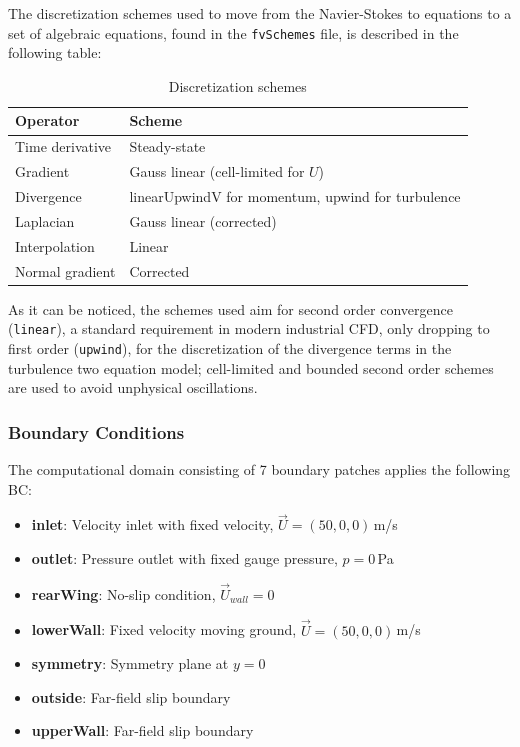 \documentclass[12pt,a4paper]{article}
\begin{document}
The discretization schemes used to move from the Navier-Stokes to equations to a set of algebraic equations, found in the \texttt{fvSchemes} file, is described in the following table:

\begin{table}[H]
\centering
\label{tab:schemes}
\begin{tabular}{@{}ll@{}}
\toprule
\textbf{Operator} & \textbf{Scheme} \\
\midrule
Time derivative & Steady-state \\
Gradient & Gauss linear (cell-limited for $U$) \\
Divergence & linearUpwindV for momentum, upwind for turbulence \\
Laplacian & Gauss linear (corrected) \\
Interpolation & Linear \\
Normal gradient & Corrected \\
\bottomrule
\end{tabular}
\caption{Discretization schemes}
\end{table}

As it can be noticed, the schemes used aim for second order convergence (\texttt{linear}), a standard requirement in modern industrial CFD, only dropping to first order (\texttt{upwind}), for the discretization of the divergence terms in the turbulence two equation model; cell-limited and bounded second order schemes are used to avoid unphysical oscillations.

\subsubsection{Boundary Conditions}

The computational domain consisting of 7 boundary patches applies the following BC:

\begin{itemize}
    \item \textbf{inlet}: Velocity inlet with fixed velocity, $\vec{U} = (50, 0, 0)$\,m/s
    \item \textbf{outlet}: Pressure outlet with fixed gauge pressure, $p = 0$\,Pa
    \item \textbf{rearWing}: No-slip condition, $\vec{U}_{wall} = 0$
    \item \textbf{lowerWall}: Fixed velocity moving ground, $\vec{U} = (50, 0, 0)$\,m/s
    \item \textbf{symmetry}: Symmetry plane at $y = 0$
    \item \textbf{outside}: Far-field slip boundary
    \item \textbf{upperWall}: Far-field slip boundary
\end{itemize}
\end{document}
